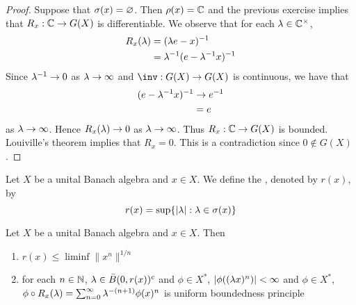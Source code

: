 \documentclass{book}
\begin{document}
\begin{proof}
	Suppose that $\sigma(x) = \varnothing$. Then $\rho(x) = \mathbb{C}$ and the previous exercise implies that $R_x: \mathbb{C} \rightarrow G(X)$ is differentiable. We observe that for each $\lambda \in \mathbb{C}^{\times}$, 
	\begin{align*}
		R_x(\lambda)
		& = (\lambda e - x)^{-1} \\
		& = \lambda^{-1} (e - \lambda^{-1}x)^{-1} \\
	\end{align*} 
	Since $\lambda^{-1} \rightarrow 0$ as $\lambda \rightarrow \infty$ and $\inv: G(X) \rightarrow G(X)$ is continuous, we have that
	\begin{align*}
		(e - \lambda^{-1}x)^{-1}
		& \rightarrow e^{-1} \\
		&= e
	\end{align*}
	as $\lambda \rightarrow \infty$. Hence $R_x(\lambda) \rightarrow 0$ as $\lambda \rightarrow \infty$. Thus $R_x: \mathbb{C} \rightarrow G(X)$ is bounded. Louiville's theorem implies that $R_x = 0$. This is a contradiction since $0 \not \in G(X)$.   
\end{proof}

	\begin{defn}
		Let $X$ be a unital Banach algebra and $x \in X$. We define the , denoted by $r(x)$, by $$r(x) = \sup \{|\lambda|: \lambda \in \sigma(x)\}$$
	\end{defn}

	\begin{ex}
		Let $X$ be a unital Banach algebra and $x \in X$. Then
		\begin{enumerate}
			\item $r(x) \leq \liminf \|x^n\|^{1/n}$
			\item for each $n \in \mathbb{N}$, $\lambda \in \bar{B}(0, r(x))^c$ and $\phi \in X^*$, $|\phi((\lambda x)^n)| < \infty$ and $\phi \in X^*$, $\phi \circ R_x(\lambda) = \sum_{n=0}^{\infty} \lambda^{-(n+1)} \phi(x)^n$ is
			 uniform boundedness principle  
		\end{enumerate}
	\end{ex}
\end{document}
